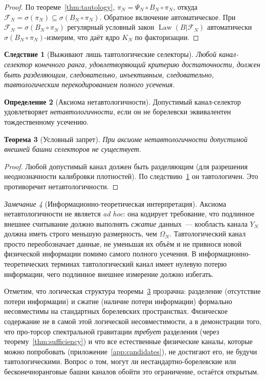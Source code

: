 \documentclass[12pt,a4paper]{article}
\theoremstyle{plain}
\newtheorem{theorem}{Теорема}[section]
\newtheorem{corollary}[theorem]{Следствие}
\theoremstyle{definition}
\newtheorem{definition}[theorem]{Определение}
\theoremstyle{remark}
\newtheorem{remark}[theorem]{Замечание}
\newcommand{\cF}{\mathcal{F}}
\newcommand{\Law}{\operatorname{Law}}
\begin{document}
\begin{proof}
По теореме~\ref{thm:tautology},
$\pi_N = \Psi_N\circ B_N\circ\pi_N$, откуда
$\cF_N = \sigma(\pi_N) \subseteq \sigma(B_N\circ\pi_N)$.
Обратное включение автоматическое.  При
$\cF_N = \sigma(B_N\circ\pi_N)$ регулярный условный закон
$\Law(B|\cF_N)$ автоматически
$\sigma(B_N\circ\pi_N)$-измерим, что даёт ядро $K_N$
по факторизации.
\end{proof}

\begin{corollary}[Выживают лишь тавтологические селекторы]
\label{cor:tautological}
Любой канал-селектор конечного ранга, удовлетворяющий критерию
достаточности, должен быть разделяющим, следовательно, инъективным,
следовательно, тавтологическим перекодированием полного усечения.
\end{corollary}

\begin{definition}[Аксиома нетавтологичности]
\label{def:NT}
Допустимый канал-селектор удовлетворяет \emph{нетавтологичности},
если он не борелевски эквивалентен тождественному усечению.
\end{definition}

\begin{theorem}[Условный запрет]
\label{thm:conditional-nogo}
При аксиоме нетавтологичности допустимой внешней башни селекторов
не существует.
\end{theorem}

\begin{proof}
Любой допустимый канал должен быть разделяющим (для разрешения
неоднозначности калибровки плотностей).  По
следствию~\ref{cor:tautological} он тавтологичен.  Это
противоречит нетавтологичности.
\end{proof}

\begin{remark}[Информационно-теоретическая интерпретация]
\label{rem:NT-motivation}
Аксиома нетавтологичности не является \emph{ad hoc}: она
кодирует требование, что подлинное внешнее считывание должно
выполнять \emph{сжатие} данных~--- кообласть канала $Y_N$
должна иметь строго меньшую размерность, чем $\Omega_N$.
Тавтологический канал просто переобозначает данные, не уменьшая
их объём и не привнося новой физической информации помимо самого
полного усечения.  В информационно-теоретических терминах
тавтологический канал имеет нулевую потерю информации, чего
подлинное внешнее измерение должно избегать.

Отметим, что логическая структура теоремы~\ref{thm:conditional-nogo}
прозрачна: разделение (отсутствие потери информации) и сжатие
(наличие потери информации) формально несовместимы на стандартных
борелевских пространствах.  Физическое содержание не в самой
этой логической несовместимости, а в демонстрации того, что
про-торсор спектральной гравитации \emph{требует} разделения
(через теорему~\ref{thm:sufficiency}) и что все естественные
физические каналы, которые можно попробовать
(приложение~\ref{app:candidates}), не достигают его, не будучи
тавтологическими.  Вопрос о том, могут ли нестандартно-борелевские
или бесконечноранговые башни каналов обойти это ограничение,
остаётся открытым.
\end{remark}
\end{document}
